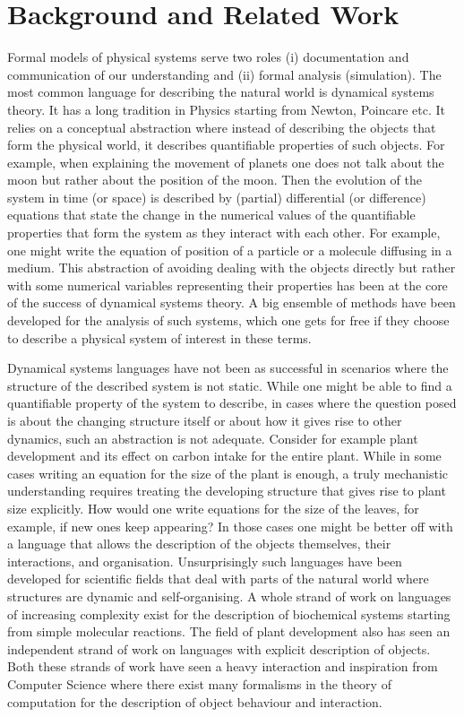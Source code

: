 \documentclass[phd]{infthesis}
\begin{document}
\chapter{Background and Related Work}
\label{chp:oc}
Formal models of physical systems serve two roles (i) documentation and
communication of our understanding and (ii) formal analysis (simulation). The
most common language for describing the natural world is dynamical systems
theory. It has a long tradition in Physics starting from Newton, Poincare
etc. It relies on a conceptual abstraction where instead of describing the
objects that form the physical world, it describes quantifiable properties of
such objects. For example, when explaining the movement of planets one does not
talk about the moon but rather about the position of the moon. Then the
evolution of the system in time (or space) is described by (partial)
differential (or difference) equations that state the change in the numerical
values of the quantifiable properties that form the system as they interact with
each other. For example, one
might write the equation of position of a particle or a molecule diffusing in a
medium. This abstraction of avoiding dealing with the objects directly but
rather with some numerical variables representing their properties has been at
the core of the success of dynamical systems theory. A big ensemble of methods
have been developed for the analysis of such systems, which one gets for free if
they choose to describe a physical system of interest in these terms.

Dynamical systems languages have not been as successful in scenarios where the
structure of the  described system is not static. While one might be able to
find a quantifiable property of the system to describe, in cases where the
question posed is about the changing structure itself or about how it gives rise
to other dynamics, such an abstraction is not adequate. Consider for example
plant development and its effect on carbon intake for the entire
plant. While in some cases writing an equation for the size of the plant is
enough, a truly mechanistic understanding requires treating the developing structure that
gives rise to plant size explicitly. How would one write equations for the size
of the leaves, for example, if new ones keep appearing?
In those cases one might be better off with a language that allows the
description of the objects themselves, their interactions, and
organisation. Unsurprisingly such languages have been developed for
scientific fields that deal with parts of the natural world where structures are
dynamic and self-organising. A whole strand of work on languages of
increasing complexity exist for the description of biochemical systems starting
from simple molecular reactions. The field of plant development also has seen an
independent strand of work on languages with explicit description of objects.
Both these strands of work have seen a heavy interaction and inspiration 
from Computer Science where there exist many formalisms in the
theory of computation for the description of object behaviour and interaction.
\end{document}
